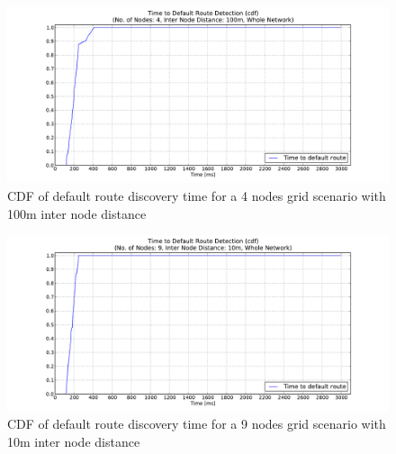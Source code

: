 \begin{figure}[htbp]
  \begin{center}
  \hspace{-20pt}
    \leavevmode
      \includegraphics[width=\textwidth]
      {Pics/results/4/MRHOF/grid/dist100_montecarlo_cdf_hist.pdf}
   \caption{CDF of default route discovery time for a 4 nodes grid scenario with 100m inter node distance}
   \label{fig:4_MRHOF_grid_100_cdf}
  \end{center}
  \vspace{-10pt}
\end{figure}

\begin{figure}[htbp]
  \begin{center}
  \hspace{-20pt}
    \leavevmode
      \includegraphics[width=\textwidth]
      {Pics/results/9/MRHOF/grid/dist10_montecarlo_cdf_hist.pdf}
   \caption{CDF of default route discovery time for a 9 nodes grid scenario with 10m inter node distance}
   \label{fig:9_MRHOF_grid_10_cdf}
  \end{center}
  \vspace{-10pt}
\end{figure}

